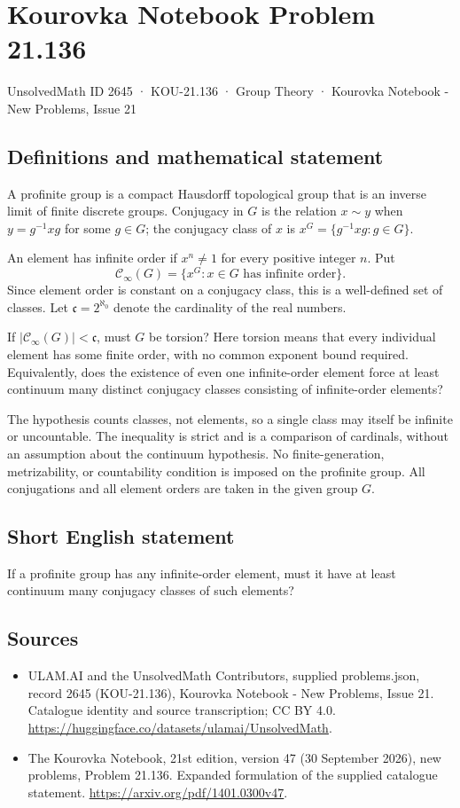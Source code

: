 \documentclass[11pt,a4paper]{article}
\begin{document}
\section*{Kourovka Notebook Problem 21.136}\label{2645}
{\small UnsolvedMath ID 2645 · KOU-21.136 · Group Theory · Kourovka Notebook - New Problems, Issue 21}
\subsection{Definitions and mathematical statement}
A profinite group is a compact Hausdorff topological group that is an inverse limit of finite discrete groups. Conjugacy in $G$ is the relation $x\sim y$ when $y=g^{-1}xg$ for some $g\in G$; the conjugacy class of $x$ is $x^G=\{g^{-1}xg:g\in G\}$.

An element has infinite order if $x^n\ne1$ for every positive integer $n$. Put
\[
 \mathcal C_\infty(G)=\{x^G:x\in G\text{ has infinite order}\}.
\]
Since element order is constant on a conjugacy class, this is a well-defined set of classes. Let $\mathfrak c=2^{\aleph_0}$ denote the cardinality of the real numbers.

If $|\mathcal C_\infty(G)|<\mathfrak c$, must $G$ be torsion? Here torsion means that every individual element has some finite order, with no common exponent bound required. Equivalently, does the existence of even one infinite-order element force at least continuum many distinct conjugacy classes consisting of infinite-order elements?

The hypothesis counts classes, not elements, so a single class may itself be infinite or uncountable. The inequality is strict and is a comparison of cardinals, without an assumption about the continuum hypothesis. No finite-generation, metrizability, or countability condition is imposed on the profinite group. All conjugations and all element orders are taken in the given group $G$.
\subsection{Short English statement}
If a profinite group has any infinite-order element, must it have at least continuum many conjugacy classes of such elements?
\subsection{Sources}
\begin{itemize}
\item[S1] ULAM.AI and the UnsolvedMath Contributors, supplied problems.json, record 2645 (KOU-21.136), Kourovka Notebook - New Problems, Issue 21. Catalogue identity and source transcription; CC BY 4.0.
\url{https://huggingface.co/datasets/ulamai/UnsolvedMath}.
\item[S2] The Kourovka Notebook, 21st edition, version 47 (30 September 2026), new problems, Problem 21.136. Expanded formulation of the supplied catalogue statement.
\url{https://arxiv.org/pdf/1401.0300v47}.
\end{itemize}
\end{document}
